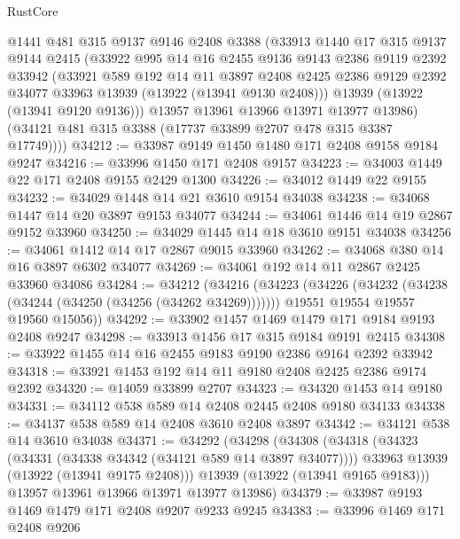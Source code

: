\begin{lexlean}{RustCore}
\begin{coremodule}
        @1441
        @481
        @315
        @9137
        @9146
        @2408
        @3388
        (@33913
          @1440
          @17
          @315
          @9137
          @9144
          @2415
          (@33922
            @995
            @14
            @16
            @2455
            @9136
            @9143
            @2386
            @9119
            @2392
            @33942
            (@33921
              @589
              @192
              @14
              @11
              @3897
              @2408
              @2425
              @2386
              @9129
              @2392
              @34077
              @33963
              @13939
              (@13922 (@13941 @9130 @2408)))
            @13939
            (@13922 (@13941 @9120 @9136)))
          @13957
          @13961
          @13966
          @13971
          @13977
          @13986)
        (@34121 @481 @315 @3388 (@17737 @33899 @2707 @478 @315 @3387 @17749))))
@34212 := @33987 @9149 @1450 @1480 @171 @2408 @9158 @9184 @9247
@34216 := @33996 @1450 @171 @2408 @9157
@34223 := @34003 @1449 @22 @171 @2408 @9155 @2429 @1300
@34226 := @34012 @1449 @22 @9155
@34232 := @34029 @1448 @14 @21 @3610 @9154 @34038
@34238 := @34068 @1447 @14 @20 @3897 @9153 @34077
@34244 := @34061 @1446 @14 @19 @2867 @9152 @33960
@34250 := @34029 @1445 @14 @18 @3610 @9151 @34038
@34256 := @34061 @1412 @14 @17 @2867 @9015 @33960
@34262 := @34068 @380 @14 @16 @3897 @6302 @34077
@34269 := @34061 @192 @14 @11 @2867 @2425 @33960 @34086
@34284 := @34212
    (@34216
      (@34223
        (@34226 (@34232 (@34238 (@34244 (@34250 (@34256 (@34262 @34269)))))))
        @19551
        @19554
        @19557
        @19560
        @15056))
@34292 := @33902 @1457 @1469 @1479 @171 @9184 @9193 @2408 @9247
@34298 := @33913 @1456 @17 @315 @9184 @9191 @2415
@34308 := @33922 @1455 @14 @16 @2455 @9183 @9190 @2386 @9164 @2392 @33942
@34318 := @33921 @1453 @192 @14 @11 @9180 @2408 @2425 @2386 @9174 @2392
@34320 := @14059 @33899 @2707
@34323 := @34320 @1453 @14 @9180
@34331 := @34112 @538 @589 @14 @2408 @2445 @2408 @9180 @34133
@34338 := @34137 @538 @589 @14 @2408 @3610 @2408 @3897
@34342 := @34121 @538 @14 @3610 @34038
@34371 := @34292
    (@34298
      (@34308
        (@34318
          (@34323 (@34331 (@34338 @34342 (@34121 @589 @14 @3897 @34077))))
          @33963
          @13939
          (@13922 (@13941 @9175 @2408)))
        @13939
        (@13922 (@13941 @9165 @9183)))
      @13957
      @13961
      @13966
      @13971
      @13977
      @13986)
@34379 := @33987 @9193 @1469 @1479 @171 @2408 @9207 @9233 @9245
@34383 := @33996 @1469 @171 @2408 @9206

\end{coremodule}
\end{lexlean}
